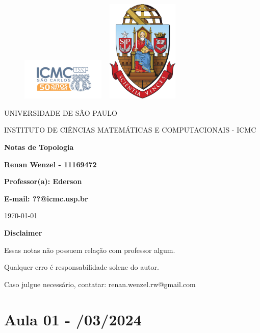 \documentclass{article}
\begin{document}
  \begin{figure}[ht]
    \includegraphics[width=4cm]{../icmc.png}
    \hspace{7cm}
    \includegraphics[height=4.9cm,width=4cm]{../brasao_usp_cor.jpg}
  \endminipage  
 \end{figure}

 \begin{center}
  \vspace{1cm}
  \LARGE
  UNIVERSIDADE DE S\~AO PAULO

  \vspace{1.3cm}
  \LARGE
  INSTITUTO DE CI\^ENCIAS MATEM\'ATICAS E COMPUTACIONAIS - ICMC

  \vspace{1.7cm}
  \Large
  \textbf{Notas de Topologia}

  \vspace{1.3cm}
  \large
  \textbf{Renan Wenzel - 11169472}

  \vspace{1.3cm}
  \large
  \textbf{Professor(a): Ederson}

   \textbf{E-mail: ??@icmc.usp.br}

  \vspace{1.3cm}
  \today
 \end{center}

  \newpage
 \textbf{{\Huge Disclaimer}}
  \vspace{5cm}

   {\huge Essas notas não possuem relação com professor algum. 

   Qualquer erro é responsabilidade solene do autor.

 Caso julgue necessário, contatar: renan.wenzel.rw@gmail.com}
  \tableofcontents

  \newpage

  \section{Aula 01 - /03/2024}

  
\end{document}
